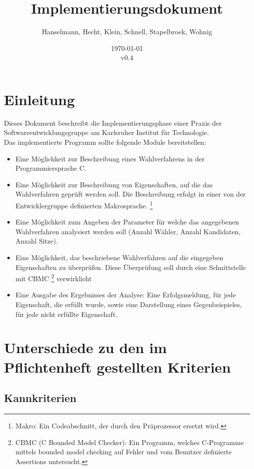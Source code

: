 \documentclass[a4paper]{scrreprt}
\begin{document}
\title{Implementierungsdokument}
\author{Hanselmann, Hecht, Klein, Schnell, Stapelbroek, Wohnig}
\date{\today\\v0.4}
\maketitle 
\tableofcontents	


\chapter{Einleitung}
Dieses Dokument beschreibt die Implementierungsphase einer Praxis der Softwareentwicklungsgruppe am Karlsruher Institut für Technologie. \\
Das implementierte Programm sollte folgende Module bereitstellen: 
\begin{itemize}
\item Eine Möglichkeit zur Beschreibung eines Wahlverfahrens in der Programmiersprache C. 
\item Eine Möglichkeit zur Beschreibung von Eigenschaften, auf die das Wahlverfahren geprüft werden soll. Die Beschreibung erfolgt in einer von der Entwicklergruppe definierten Makrosprache. \footnote{Makro: Ein Codeabschnitt, der durch den Präprozessor ersetzt wird.}
\item Eine Möglichkeit zum Angeben der Parameter für welche das angegebenen Wahlverfahren analysiert werden soll (Anzahl Wähler, Anzahl Kandidaten, Anzahl Sitze). 
\item Eine Möglichkeit, das beschriebene Wahlverfahren auf die eingegeben Eigenschaften zu überprüfen. Diese Überprüfung soll durch eine Schnittstelle mit CBMC \footnote{CBMC (C Bounded Model Checker): Ein Programm, welches C-Programme mittels bounded model checking auf Fehler und vom Benutzer definierte Assertions untersucht. } verwirklicht
\item Eine Ausgabe des Ergebnisses der Analyse: Eine Erfolgsmeldung, für jede Eigenschaft, die erfüllt wurde, sowie eine Darstellung eines Gegenbeispieles, für jede nicht erfüllte Eigenschaft. 
\end{itemize}


\chapter{Unterschiede zu den im Pflichtenheft gestellten Kriterien}

\section{Kannkriterien}
\end{document}
